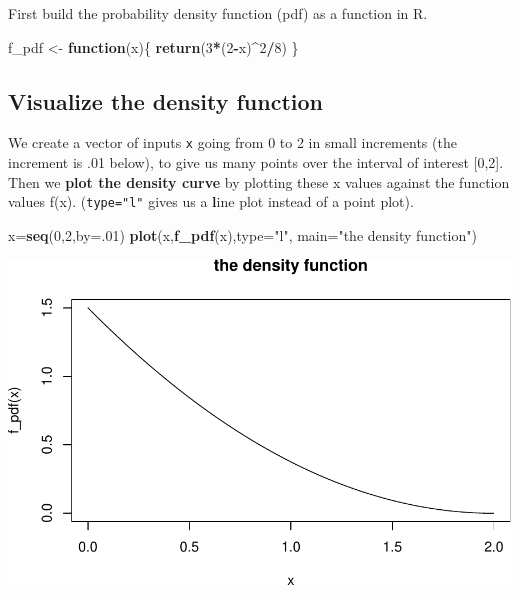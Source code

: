 \documentclass[
]{book}
\newenvironment{Shaded}{\begin{snugshade}}{\end{snugshade}}
\newcommand{\AttributeTok}[1]{\textcolor[rgb]{0.13,0.29,0.53}{#1}}
\newcommand{\ControlFlowTok}[1]{\textcolor[rgb]{0.13,0.29,0.53}{\textbf{#1}}}
\newcommand{\DecValTok}[1]{\textcolor[rgb]{0.00,0.00,0.81}{#1}}
\newcommand{\FunctionTok}[1]{\textcolor[rgb]{0.13,0.29,0.53}{\textbf{#1}}}
\newcommand{\NormalTok}[1]{#1}
\newcommand{\OtherTok}[1]{\textcolor[rgb]{0.56,0.35,0.01}{#1}}
\newcommand{\SpecialCharTok}[1]{\textcolor[rgb]{0.81,0.36,0.00}{\textbf{#1}}}
\newcommand{\StringTok}[1]{\textcolor[rgb]{0.31,0.60,0.02}{#1}}
\theoremstyle{definition}
\theoremstyle{definition}
\theoremstyle{definition}
\theoremstyle{definition}
\theoremstyle{remark}
\begin{document}
First build the probability density function (pdf) as a function in R.

\begin{Shaded}
\begin{Highlighting}[]
\NormalTok{f\_pdf }\OtherTok{\textless{}{-}} \ControlFlowTok{function}\NormalTok{(x)\{}
  \FunctionTok{return}\NormalTok{(}\DecValTok{3}\SpecialCharTok{*}\NormalTok{(}\DecValTok{2}\SpecialCharTok{{-}}\NormalTok{x)}\SpecialCharTok{\^{}}\DecValTok{2}\SpecialCharTok{/}\DecValTok{8}\NormalTok{)}
\NormalTok{  \}}
\end{Highlighting}
\end{Shaded}

\subsection*{Visualize the density function}\label{visualize-the-density-function}

We create a vector of inputs \texttt{x} going from 0 to 2 in small increments (the increment is .01 below), to give us many points over the interval of interest {[}0,2{]}. Then we \textbf{plot the density curve} by plotting these x values against the function values f(x). (\texttt{type="l"} gives us a \textbf{l}ine plot instead of a point plot).

\begin{Shaded}
\begin{Highlighting}[]
\NormalTok{x}\OtherTok{=}\FunctionTok{seq}\NormalTok{(}\DecValTok{0}\NormalTok{,}\DecValTok{2}\NormalTok{,}\AttributeTok{by=}\NormalTok{.}\DecValTok{01}\NormalTok{)}
\FunctionTok{plot}\NormalTok{(x,}\FunctionTok{f\_pdf}\NormalTok{(x),}\AttributeTok{type=}\StringTok{"l"}\NormalTok{,}
     \AttributeTok{main=}\StringTok{"the density function"}\NormalTok{)}
\end{Highlighting}
\end{Shaded}

\includegraphics{math340-notes_files/figure-latex/plot pdf-1.pdf}
\end{document}
